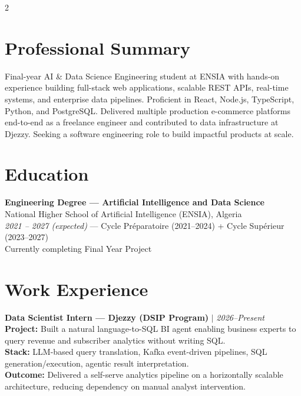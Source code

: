 \documentclass[8pt, letterpaper]{extarticle}
\begin{document}
\begin{multicols}{2}
\RaggedRight

\section*{{\color{accent}}\; Professional Summary}
Final-year AI \& Data Science Engineering student at ENSIA with hands-on experience building full-stack web applications, scalable REST APIs, real-time systems, and enterprise data pipelines. Proficient in React, Node.js, TypeScript, Python, and PostgreSQL. Delivered multiple production e-commerce platforms end-to-end as a freelance engineer and contributed to data infrastructure at Djezzy. Seeking a software engineering role to build impactful products at scale.

\section*{{\color{accent}}\; Education}
\textbf{Engineering Degree — Artificial Intelligence and Data Science} \\
National Higher School of Artificial Intelligence (ENSIA), Algeria \\
\textit{2021 – 2027 (expected)} — Cycle Préparatoire (2021–2024) + Cycle Supérieur (2023–2027) \\
Currently completing Final Year Project

\section*{{\color{accent}}\; Work Experience}

\textbf{Data Scientist Intern — Djezzy (DSIP Program)} \textcolor{rulecolor}{$|$} \textit{2026–Present} \\
\textbf{Project:} Built a natural language-to-SQL BI agent enabling business experts to query revenue and subscriber analytics without writing SQL. \\
\textbf{Stack:} LLM-based query translation, Kafka event-driven pipelines, SQL generation/execution, agentic result interpretation. \\
\textbf{Outcome:} Delivered a self-serve analytics pipeline on a horizontally scalable architecture, reducing dependency on manual analyst intervention. \vspace{3pt}


\end{multicols}
\end{document}
